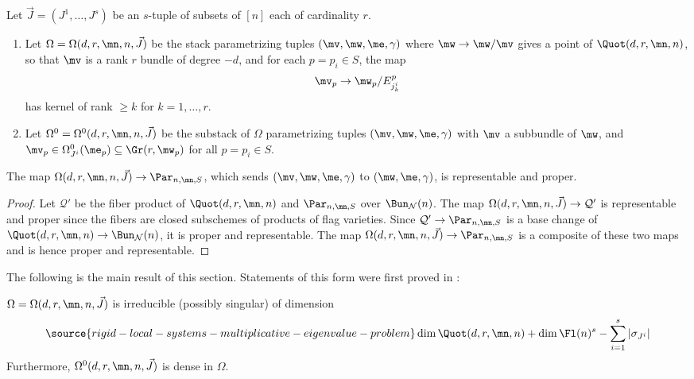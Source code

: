 \begin{defi}
\notready\label{mindful}
Let $\vec{J}=(J^1,\dots,J^s)$ be an $s$-tuple of subsets  of $[n]$ each of cardinality $r$.
\begin{enumerate}
\item Let $\Omega=\Omega(d,r,\mn,n,\vec{J})$ be the stack parametrizing
tuples $(\mv,\mw,\me,\gamma)$ where $\mw\to \mw/\mv$ gives a point of $\Quot(d,r,\mn,n)$, so that $\mv$ is a rank $r$ bundle of degree $-d$, and for each $p=p_i\in S$, the map
 $$\mv_p\to \mw_p/E^p_{j^i_k}$$
 has kernel of rank $\geq k$ for $k=1,\dots,r$.
\item Let $\Omega^0=\Omega^0(d,r,\mn,n,\vec{J})$ be the substack of $\Omega$ parametrizing tuples $(\mv,\mw,\me,\gamma)$ with $\mv$ a subbundle of $\mw$, and $\mv_p\in \Omega^0_{J^i}(\me_p)\subseteq \Gr(r,\mw_p)$ for all $p=p_i\in S$.
\end{enumerate}
\end{defi}
\begin{lemma}
\notready\label{repres}
The map $\Omega(d,r,\mn,n,\vec{J})\to \Par_{n,\mn,S}$, which sends $(\mv,\mw,\me,\gamma)$ to $(\mw,\me,\gamma)$, is representable and proper.
\end{lemma}
\begin{proof}
Let $\mathcal{Q}'$ be the fiber product of  $\Quot(d,r,\mn,n)$ and  $\Par_{n,\mn,S}$ over $\Bun_{\mathcal{N}}(n)$. The map  $\Omega(d,r,\mn,n,\vec{J})\to \mathcal{Q}'$ is representable and proper since the fibers are closed subschemes of products of flag varieties. Since  $\mathcal{Q}'\to \Par_{n,\mn,S}$ is a base change of $\Quot(d,r,\mn,n)\to \Bun_{\mathcal{N}}(n)$, it is proper and representable. The map $\Omega(d,r,\mn,n,\vec{J})\to \Par_{n,\mn,S}$ is a composite of these two maps and is hence  proper and representable.

\end{proof}

The following is the main result of this section. Statements of this form were first proved in \cite{bertie}:
 \begin{proposition}
\notready\label{maya}
  $\Omega=\Omega(d,r,\mn,n,\vec{J})$ is irreducible (possibly singular) of dimension
 \begin{equation}\label{codeyy}
\source{rigid-local-systems-multiplicative-eigenvalue-problem}
\dim \Quot(d,r,\mn,n) + \dim \Fl(n)^s -\sum_{i=1}^s |\sigma_{J^i}|
\end{equation}
Furthermore, $\Omega^0(d,r,\mn,n,\vec{J})$ is dense in $\Omega$.
 \end{proposition}
